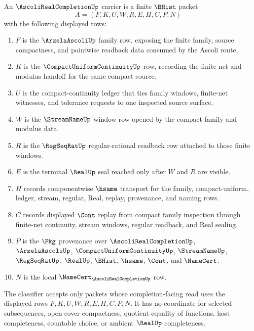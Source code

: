\begin{definition}
\label{def:ascoli-real-completion-carrier}
An $\AscoliRealCompletionUp$ carrier is a finite $\BHist$ packet
$$
A=(F,K,U,W,R,E,H,C,P,N)
$$
with the following displayed rows:
\begin{enumerate}
\item $F$ is the $\ArzelaAscoliUp$ family row, exposing the finite family, source compactness, and pointwise readback data consumed by the Ascoli route.
\item $K$ is the $\CompactUniformContinuityUp$ row, recording the finite-net and modulus handoff for the same compact source.
\item $U$ is the compact-continuity ledger that ties family windows, finite-net witnesses, and tolerance requests to one inspected source surface.
\item $W$ is the $\StreamNameUp$ window row opened by the compact family and modulus data.
\item $R$ is the $\RegSeqRatUp$ regular-rational readback row attached to those finite windows.
\item $E$ is the terminal $\RealUp$ seal reached only after $W$ and $R$ are visible.
\item $H$ records componentwise $\hsame$ transport for the family, compact-uniform, ledger, stream, regular, Real, replay, provenance, and naming rows.
\item $C$ records displayed $\Cont$ replay from compact family inspection through finite-net continuity, stream windows, regular readback, and Real sealing.
\item $P$ is the $\Pkg$ provenance over $\AscoliRealCompletionUp$, $\ArzelaAscoliUp$, $\CompactUniformContinuityUp$, $\StreamNameUp$, $\RegSeqRatUp$, $\RealUp$, $\BHist$, $\hsame$, $\Cont$, and $\NameCert$.
\item $N$ is the local $\NameCert_{\AscoliRealCompletionUp}$ row.
\end{enumerate}
The classifier accepts only packets whose completion-facing read uses the displayed rows $F,K,U,W,R,E,H,C,P,N$. It has no coordinate for selected subsequences, open-cover compactness, quotient equality of functions, host completeness, countable choice, or ambient $\RealUp$ completeness.
\end{definition}

